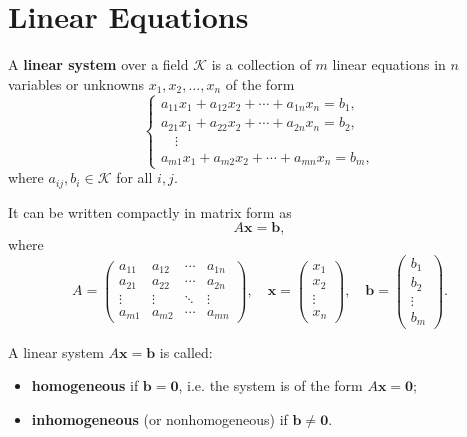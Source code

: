 \section{Linear Equations}
\begin{definitionenv}
	A \textbf{linear system} over a field $\mathcal{K}$ is a collection of $m$ linear equations in $n$ variables or unknowns
	$x_1, x_2, \dots, x_n$ of the form
	\[
	\begin{cases}
		a_{11}x_1 + a_{12}x_2 + \cdots + a_{1n}x_n = b_1,\\
		a_{21}x_1 + a_{22}x_2 + \cdots + a_{2n}x_n = b_2,\\
		\quad \vdots\\
		a_{m1}x_1 + a_{m2}x_2 + \cdots + a_{mn}x_n = b_m,
	\end{cases}
	\]
	where $a_{ij}, b_i \in \mathcal{K}$ for all $i,j$.

	It can be written compactly in matrix form as
	\[
	A\bm{x} = \bm{b},
	\]
	where
	\[
	A =
	\begin{pmatrix}
		a_{11} & a_{12} & \cdots & a_{1n} \\
		a_{21} & a_{22} & \cdots & a_{2n} \\
		\vdots & \vdots & \ddots & \vdots \\
		a_{m1} & a_{m2} & \cdots & a_{mn}
	\end{pmatrix},
	\quad
	\bm{x} =
	\begin{pmatrix}
		x_1 \\ x_2 \\ \vdots \\ x_n
	\end{pmatrix},
	\quad
	\bm{b} =
	\begin{pmatrix}
		b_1 \\ b_2 \\ \vdots \\ b_m
	\end{pmatrix}.
	\]
\end{definitionenv}


\begin{definitionenv}
	A linear system $A\bm{x} = \bm{b}$ is called:
	\begin{itemize}
		\item \textbf{homogeneous} if $\bm{b} = \bm{0}$, i.e. the system is of the form $A\bm{x} = \bm{0}$;
		\item \textbf{inhomogeneous} (or nonhomogeneous) if $\bm{b} \neq \bm{0}$.
	\end{itemize}
\end{definitionenv}

